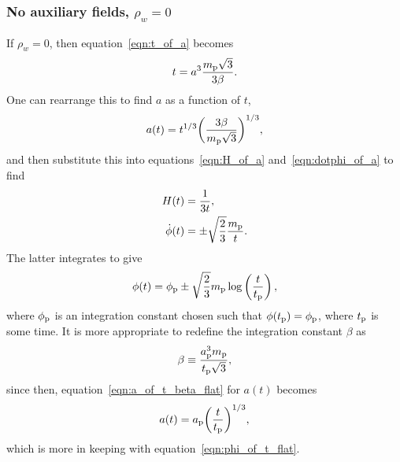 \subsubsection{No auxiliary fields, $\rho_w=0$}
If $\rho_w=0$, then equation~\eqref{eqn:t_of_a} becomes
%
\begin{equation}
  t = a^3 \frac{m_{\mathrm{p}}\sqrt{3}}{3\beta}.
\end{equation}
%
One can rearrange this to find $a$ as a function of $t$,
%
\begin{equation}
  a(t)
  =
  t^{1/3} {\left(\frac{3\beta}{m_{\mathrm{p}}\sqrt{3}}\right)}^{1/3},
  \label{eqn:a_of_t_beta_flat}
\end{equation}
%
and then substitute this into equations~\eqref{eqn:H_of_a} and~\eqref{eqn:dotphi_of_a} to find
%
\begin{align}
  H(t) 
  &= 
  \frac{1}{3t}, 
  \label{eqn:H_of_t_flat} 
  \\
  \dot{\phi}(t) 
  &= 
  \pm\sqrt{\frac{2}{3}}\frac{m_{\mathrm{p}}}{t}.
  \label{eqn:dotphi_of_t_flat}
\end{align}
%
The latter integrates to give
%
\begin{equation}
  \phi(t) 
  = 
  \phi_{\mathrm{p}} \pm\sqrt{\frac{2}{3}}m_{\mathrm{p}}\log\left(\frac{t}{t_{\mathrm{p}}}\right),  
  \label{eqn:phi_of_t_flat}
\end{equation}
%
where $\phi_{\mathrm{p}}$ is an integration constant chosen such that $\phi(t_{\mathrm{p}})=\phi_{\mathrm{p}}$, where $t_{\mathrm{p}}$ is some time. It is more appropriate to redefine the integration constant $\beta$ as
%
\begin{equation}
  \beta 
  \equiv 
  \frac{a_{\mathrm{p}}^3m_{\mathrm{p}}}{t_{\mathrm{p}}\sqrt{3}}, 
  \label{eqn:beta_def}
\end{equation}
%
since then, equation~\eqref{eqn:a_of_t_beta_flat} for $a(t)$ becomes
%
\begin{equation}
  a(t) 
  = 
  a_{\mathrm{p}} {\left(\frac{t}{t_{\mathrm{p}}}\right)}^{1/3},
  \label{eqn:a_of_t_flat}
\end{equation}
%
which is more in keeping with equation~\eqref{eqn:phi_of_t_flat}.  

